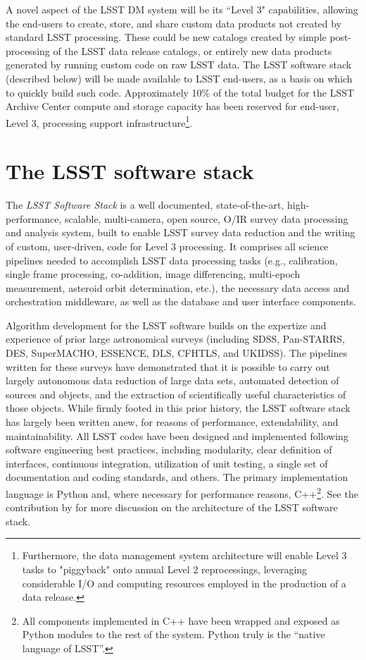 \documentclass[11pt,twoside]{article}
\begin{document}
A novel aspect of the LSST DM system will be its ``Level 3"
capabilities, allowing the end-users to create, store, and share
custom data products not created by standard LSST processing. These
could be new catalogs created by simple post-processing of the LSST
data release catalogs, or entirely new data products generated by
running custom code on raw LSST data. The LSST software stack (described
below) will be made available to LSST end-users, as a basis on which
to quickly build such code. Approximately 10\% of the total
budget for the LSST Archive Center compute and storage capacity has
been reserved for end-user, Level 3, processing support
infrastructure\footnote{Furthermore, the data management system
architecture will enable Level 3 tasks to "piggyback" onto annual
Level 2 reprocessings, leveraging considerable I/O and
computing resources employed in the production of a data release.}.

\section{The LSST software stack}
\label{sec:dmstack}

The {\em LSST Software Stack} is a well documented, state-of-the-art,
high-performance, scalable, multi-camera, open source, O/IR survey
data processing and analysis system, built to enable LSST survey data
reduction and the writing of custom, user-driven, code for Level 3
processing. It comprises
all science pipelines needed to accomplish LSST data processing tasks
(e.g., calibration, single frame processing, co-addition, image
differencing, multi-epoch measurement, asteroid orbit determination,
etc.), the necessary data
access and orchestration middleware, as well as the database and user
interface components.

Algorithm development for the LSST software builds on the expertize
and experience of prior large astronomical surveys (including SDSS,
Pan-STARRS, DES,
SuperMACHO, ESSENCE,  DLS, CFHTLS, and UKIDSS). The pipelines written
for these surveys have demonstrated that it is possible to carry out
largely autonomous data
reduction of large data sets, automated detection of sources and
objects, and the
extraction of scientifically useful characteristics of those objects.
While firmly footed in this prior history, the LSST software stack has
largely been written anew, for reasons of performance, extendability, and
maintainability. All LSST codes have been designed and implemented
following software engineering best practices, including modularity, clear definition
of interfaces, continuous integration,
utilization of unit testing, a single set of documentation and coding
standards, and others. The primary implementation language is Python and, where
necessary for performance reasons, C++\footnote{All components implemented
in C++ have been wrapped and exposed as Python modules to the rest
of the system. Python truly is the ``native language of LSST''.}.
See the contribution by \citet{P056_adassxxv} for more discussion on the
architecture of the LSST software stack.
\end{document}
